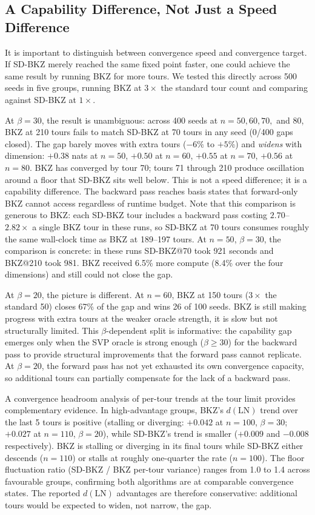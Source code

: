 \documentclass[journal=cic,version=preprint]{iacrj}
\begin{document}
\subsection{A Capability Difference, Not Just a Speed Difference}
\label{sec:capability}

It is important to distinguish between convergence speed and convergence target. If SD-BKZ merely reached the same fixed point faster, one could achieve the same result by running BKZ for more tours. We tested this directly across 500 seeds in five groups, running BKZ at $3\times$ the standard tour count and comparing against SD-BKZ at $1\times$.

At $\beta=30$, the result is unambiguous: across 400 seeds at $n=50, 60, 70,$ and $80$, BKZ at 210 tours fails to match SD-BKZ at 70 tours in any seed (0/400 gaps closed). The gap barely moves with extra tours ($-6\%$ to $+5\%$) and \emph{widens} with dimension: $+0.38$ nats at $n=50$, $+0.50$ at $n=60$, $+0.55$ at $n=70$, $+0.56$ at $n=80$. BKZ has converged by tour 70; tours 71 through 210 produce oscillation around a floor that SD-BKZ sits well below. This is not a speed difference; it is a capability difference. The backward pass reaches basis states that forward-only BKZ cannot access regardless of runtime budget. Note that this comparison is generous to BKZ: each SD-BKZ tour includes a backward pass costing $2.70$--$2.82\times$ a single BKZ tour in these runs, so SD-BKZ at 70 tours consumes roughly the same wall-clock time as BKZ at 189--197 tours. At $n=50$, $\beta=30$, the comparison is concrete: in these runs SD-BKZ@70 took 921 seconds and BKZ@210 took 981. BKZ received 6.5\% more compute (8.4\% over the four dimensions) and still could not close the gap.

At $\beta=20$, the picture is different. At $n=60$, BKZ at 150 tours ($3\times$ the standard 50) closes 67\% of the gap and wins 26 of 100 seeds. BKZ is still making progress with extra tours at the weaker oracle strength, it is slow but not structurally limited. This $\beta$-dependent split is informative: the capability gap emerges only when the SVP oracle is strong enough ($\beta\geq 30$) for the backward pass to provide structural improvements that the forward pass cannot replicate. At $\beta=20$, the forward pass has not yet exhausted its own convergence capacity, so additional tours can partially compensate for the lack of a backward pass.

A convergence headroom analysis of per-tour trends at the tour limit provides complementary evidence. In high-advantage groups, BKZ's $d(\mathrm{LN})$ trend over the last 5 tours is positive (stalling or diverging: $+0.042$ at $n=100$, $\beta=30$; $+0.027$ at $n=110$, $\beta=20$), while SD-BKZ's trend is smaller ($+0.009$ and $-0.008$ respectively). BKZ is stalling or diverging in its final tours while SD-BKZ either descends ($n=110$) or stalls at roughly one-quarter the rate ($n=100$). The floor fluctuation ratio (SD-BKZ / BKZ per-tour variance) ranges from 1.0 to 1.4 across favourable groups, confirming both algorithms are at comparable convergence states. The reported $d(\mathrm{LN})$ advantages are therefore conservative: additional tours would be expected to widen, not narrow, the gap.
\end{document}
